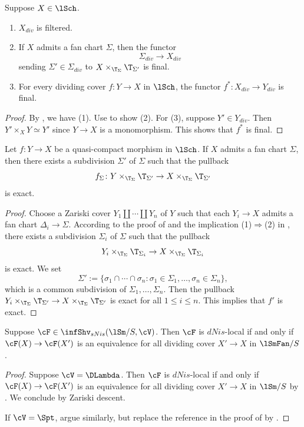 \documentclass[10pt]{amsart}
\begin{document}
\begin{lem}
\label{divlocal.10}
Suppose $X\in \lSch$.
\begin{enumerate}
\item[{\rm (1)}]
$X_{div}$ is filtered.
\item[{\rm (2)}]
If $X$ admits a fan chart $\Sigma$, then the functor
\[
\Sigma_{div}\to X_{div}
\]
sending $\Sigma'\in \Sigma_{div}$ to $X\times_{\T_\Sigma}\T_{\Sigma'}$ is final.
\item[{\rm (3)}]
For every dividing cover $f\colon Y\to X$ in $\lSch$, the functor $f^*\colon X_{div}\to Y_{div}$ is final.
\end{enumerate}
\end{lem}
\begin{proof}
By \cite[Proposition A.11.14]{logDM}, we have (1).
Use \cite[Proposition A.11.5]{logDM} to show (2).
For (3), suppose $Y'\in Y_{div}$.
Then $Y'\times_X Y\simeq Y'$ since $Y\to X$ is a monomorphism.
This shows that $f^*$ is final.
\end{proof}

\begin{prop}
\label{divlocal.12}
Let $f\colon Y\to X$ be a quasi-compact morphism in $\lSch$.
If $X$ admits a fan chart $\Sigma$, then there exists a subdivision $\Sigma'$ of $\Sigma$ such that the pullback
\[
f_\Sigma\colon Y\times_{\T_\Sigma}\T_{\Sigma'}\to X\times_{\T_\Sigma}\T_{\Sigma'}
\]
is exact.
\end{prop}
\begin{proof}
Choose a Zariski cover $Y_1\amalg \cdots \amalg Y_n$ of $Y$ such that each $Y_i\to X$ admits a fan chart $\Delta_i\to \Sigma$.
According to the proof of \cite[Theorem III.2.6.7]{Ogu} and the implication (1)$\Rightarrow$(2) in \cite[Theorem III.2.2.7]{Ogu}, there exists a subdivision $\Sigma_i$ of $\Sigma$ such that the pullback
\[
Y_i\times_{\T_{\Sigma}}\T_{\Sigma_i}
\to
X\times_{\T_{\Sigma}}\T_{\Sigma_i}
\]
is exact.
We set
\[
\Sigma'
:=
\{\sigma_1\cap \cdots \cap \sigma_n
:
\sigma_1\in \Sigma_1,\ldots,\sigma_n\in \Sigma_n\},
\]
which is a common subdivision of $\Sigma_1,\ldots,\Sigma_n$.
Then the pullback $Y_i\times_{\T_{\Sigma}}\T_{\Sigma'}\to X\times_{\T_{\Sigma}}\T_{\Sigma'}$ is exact for all $1\leq i\leq n$.
This implies that $f'$ is exact.
\end{proof}

\begin{prop}
\label{divlocal.8}
Suppose $\cF\in \infShv_{sNis}(\lSm/S,\cV)$.
Then $\cF$ is $dNis$-local if and only if $\cF(X)\to \cF(X')$ is an equivalence for all dividing cover $X'\to X$ in $\lSmFan/S$.
\end{prop}
\begin{proof}
Suppose $\cV=\DLambda$.
Then $\cF$ is $dNis$-local if and only if $\cF(X)\to \cF(X')$ is an equivalence for all dividing cover $X'\to X$ in $\lSm/S$ by \cite[Proposition 3.3.30, Corollary 3.4.11]{logDM}.
We conclude by Zariski descent.

If $\cV=\Spt$, argue similarly, but replace the reference \cite[Theorem 3.7]{MR2415380} in the proof of \cite[Corollary 3.4.11]{logDM} by \cite[Theorem 3.4]{MR2415380}.
\end{proof}
\end{document}

